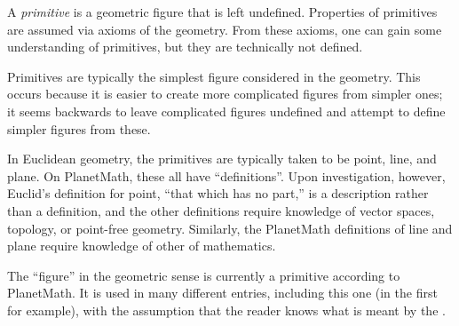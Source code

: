\documentclass[12pt]{article}
\begin{document}
A \emph{primitive} is a geometric figure that is left undefined.  Properties of primitives are assumed via axioms of the geometry.  From these axioms, one can gain some understanding of primitives, but they are technically not defined.

Primitives are typically the simplest figure considered in the geometry.  This occurs because it is easier to create more complicated figures from simpler ones; it seems backwards to leave complicated figures undefined and attempt to define simpler figures from these.

In Euclidean geometry, the primitives are typically taken to be point, line, and plane.  On PlanetMath, these all have ``definitions''.  Upon investigation, however, Euclid's definition for point, ``that which has no part,'' is a description rather than a definition, and the other definitions require knowledge of vector spaces, topology, or point-free geometry.  Similarly, the PlanetMath definitions of line and plane require knowledge of other  of mathematics.

The  ``figure'' in the geometric sense is currently a primitive according to PlanetMath.  It is used in many different entries, including this one (in the first  for example), with the assumption that the reader knows what is meant by the .
\end{document}
